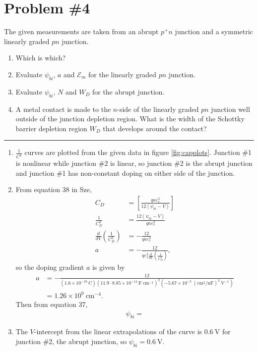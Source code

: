 \documentclass{article}
\newcommand{\horline}
           {\begin{center}
              \noindent\rule{8cm}{0.4pt}
            \end{center}}
\begin{document}
\pagebreak

\section*{Problem \#4}
The given measurements are taken from an abrupt $p^{+}n$ junction and a
symmetric linearly graded $pn$ junction. 
\begin{enumerate}
  \item{Which is which?}
  \item{Evaluate $\psi_{bi}$, $a$ and $\mathscr{E}_{m}$ for the
linearly graded $pn$ junction.}
  \item{Evaluate $\psi_{bi}$, $N$ and $W_D$ for the abrupt junction.}
  \item{A metal contact is made to the $n$-side of the linearly graded $pn$
  junction well outside of the junction depletion region. What is the width of
  the Schottky barrier depletion region $W_D$ that develops around the 
  contact?}
\end{enumerate}

\horline
\begin{enumerate}
  \item{$\frac{1}{C^2}$ curves are plotted from the given data in figure 
        \ref{fig:capplots}. Junction \#1 is nonlinear while junction \#2 is 
        linear, so junction \#2 is the abrupt junction and junction \#1 has 
        non-constant doping on either side of the junction.
       }
  \item{From equation 38 in Sze, 
        \begin{align*}
          C_D &= \left[\frac{q a \varepsilon_s^2}{12 (\psi_{bi} - V)}\right] \\
          \frac{1}{C_D^3} &= \frac{12(\psi_{bi} - V)}{q a \varepsilon_s^2} \\
          \frac{d}{dV}\left(\frac{1}{C_D^3}\right) &= -\frac{12}{q a \varepsilon_s^2} \\
          a &= -\frac{12}{q \varepsilon_s^2 \frac{d}{dV}\left(\frac{1}{C_D^3}\right)},
        \end{align*}
        so the doping gradient $a$ is given by
        \begin{align*}
        a &= -\frac{12}{(1.6 \times 10^{-19} ~\mathrm{C})
                       (11.9 \cdot 8.85 \times 10^{-14} ~\mathrm{F}~\mathrm{cm}^{-1})^2
                       (-5.67 \times 10^{-5} ~\mathrm{(cm^2 / nF)}^3 ~\mathrm{V}^{-1})
                      } \\
          &= 1.26 \times 10^{9} ~\mathrm{cm}^{-4}.
        \end{align*}
        Then from equation 37,
        \begin{align*}
          \psi_{bi} = 
        \end{align*}
       }
  \item{The $V$-intercept from the linear extrapolations of the curve is
        $0.6 ~\mathrm{V}$ for junction \#2, the abrupt junction,
        so $\psi_{bi} = 0.6 ~\mathrm{V}$.
       }
\end{enumerate}
\end{document}
